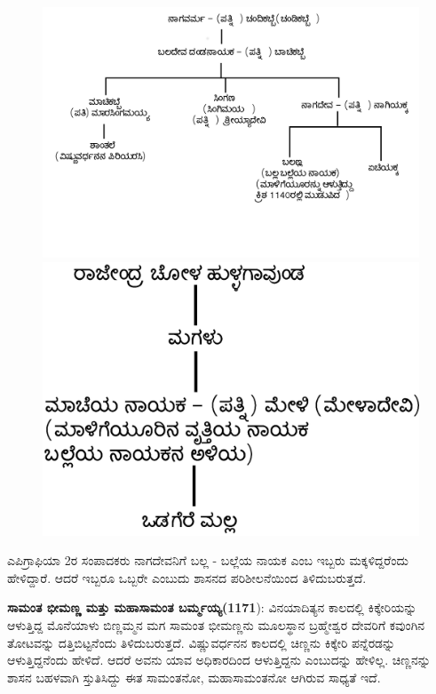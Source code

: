 \begin{figure}[H]
\includegraphics[scale=1.02]{images/chap3/chap3fig4-1.jpeg}

\includegraphics[scale=1.1]{images/chap3/chap3fig4.2.jpg}
\end{figure}

ಎಪಿಗ್ರಾಫಿಯಾ 2ರ ಸಂಪಾದಕರು ನಾಗದೇವನಿಗೆ ಬಲ್ಲ - ಬಲ್ಲೆಯ ನಾಯಕ ಎಂಬ ಇಬ್ಬರು ಮಕ್ಕಳಿದ್ದರೆಂದು ಹೇಳಿದ್ದಾರೆ. ಆದರೆ ಇಬ್ಬರೂ ಒಬ್ಬರೇ ಎಂಬುದು ಶಾಸನದ ಪರಿಶೀಲನೆಯಿಂದ ತಿಳಿದುಬರುತ್ತದೆ.

\textbf{ಸಾಮಂತ ಭೀಮಣ್ಣ ಮತ್ತು ಮಹಾಸಾಮಂತ ಬರ್ಮ್ಮಯ್ಯ(1171}): ವಿನಯಾದಿತ್ಯನ ಕಾಲದಲ್ಲಿ ಕಿಕ್ಕೇರಿಯನ್ನು ಆಳುತ್ತಿದ್ದ ಮೊನೆಯಾಳು ಬಿಣ್ಣಮ್ಮನ ಮಗ ಸಾಮಂತ ಭೀಮಣ್ಣನು ಮೂಲಸ್ಥಾನ ಬ್ರಹ್ಮೇಶ್ವರ ದೇವರಿಗೆ ಕವುಂಗಿನ ತೋಟವನ್ನು ದತ್ತಿಬಿಟ್ಟನೆಂದು ತಿಳಿದುಬರುತ್ತದೆ. ವಿಷ್ಣುವರ್ಧನನ ಕಾಲದಲ್ಲಿ ಚಿಣ್ಣನು ಕಿಕ್ಕೇರಿ ಪನ್ನೆರಡನ್ನು ಆಳುತ್ತಿದ್ದನೆಂದು ಹೇಳಿದೆ. ಆದರೆ ಅವನು ಯಾವ ಅಧಿಕಾರದಿಂದ ಆಳುತ್ತಿದ್ದನು ಎಂಬುದನ್ನು ಹೇಳಿಲ್ಲ. ಚಿಣ್ಣನನ್ನು ಶಾಸನ ಬಹಳವಾಗಿ ಸ್ತುತಿಸಿದ್ದು ಈತ ಸಾಮಂತನೋ, ಮಹಾಸಾಮಂತನೋ ಆಗಿರುವ ಸಾಧ್ಯತೆ ಇದೆ.

